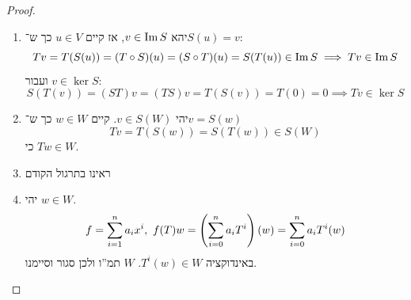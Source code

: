 \documentclass[name=רשימות אלגברה לינארית 2א]{../../../tex/classes/megasumPreamble}
\begin{document}
	\begin{proof}\,
		\begin{enumerate}
			\item יהא $v \in \operatorname{Im} S$, אז קיים $u \in V$ כך ש־$S(u) = v$: 
			\[ Tv = T(S(u)) = (T \circ S)(u) = (S \circ T)(u) = S(T(u)) \in \operatorname{Im} S \implies Tv \in \operatorname{Im} S \]
			ועבור $v \in \ker S$: 
			\[ S(T(v)) = (ST)v = (TS)v = T(S(v)) = T(0) = 0 \implies Tv \in \ker S \]
			\item יהי $v \in S(W)$. קיים $w \in W$ כך ש־$v = S(w)$
			\[ Tv = T(S(w)) = S(T(w)) \in S(W) \]
			כי $Tw \in W$. 
			\item ראינו בתרגול הקודם
			\item יהי $w \in W$. 
			\[ f = \sum_{i = 1}^{n}a_ix^{i}, \ f(T)w = \left ( \sum_{i = 0}^{n}a_iT^{i} \right )(w) = \sum_{i = 0}^{n}a_iT^{i}(w) \]
			באינדוקציה $T^{i}(w) \in W$. $W$ תמ''ו ולכן סגור וסיימנו. 
		\end{enumerate}
		\envendproof
	\end{proof}
	
\end{document}
